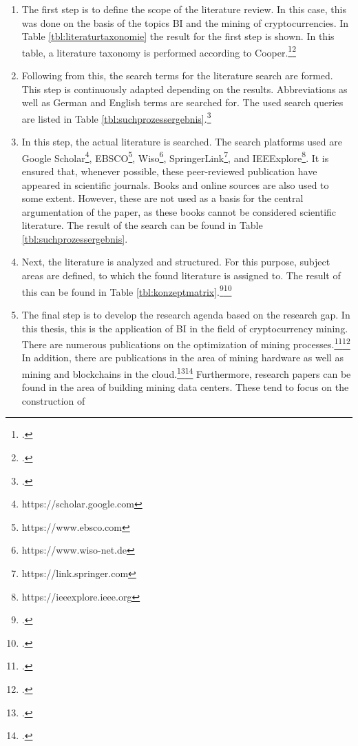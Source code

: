 \begin{enumerate} 
    \item The first step is to define the scope of the literature review. In this case, this was done on the basis of the topics \ac{BI} and
    the mining of cryptocurrencies. In Table \ref{tbl:literaturtaxonomie} the result for the first step is shown. In
    this table, a literature taxonomy is performed according to Cooper.\footcite[Cf.][p. 2212]{brocke2009reconstructing}\footcite[Cf.][]{cooper1988organizing} 
    \item Following from this, the search terms for the literature search are formed. This step is continuously adapted depending on
    the results. Abbreviations as well as German and English terms are searched for. The used 
    search queries are listed in Table \ref{tbl:suchprozessergebnis}.\footcite[Cf.][pp. 2211]{brocke2009reconstructing} 
    \item In this step, the actual literature is searched. The search platforms used are Google
    Scholar\footnote{https://scholar.google.com}, EBSCO\footnote{https://www.ebsco.com}, Wiso\footnote{https://www.wiso-net.de}, 
    SpringerLink\footnote{https://link.springer.com}, and IEEExplore\footnote{https://ieeexplore.ieee.org}. It is ensured that,
    whenever possible, these peer-reviewed publication have appeared in scientific journals. 
    Books and online sources are also used to some extent. However, these are not used as a basis for the central
    argumentation of the paper, as these books cannot be considered scientific literature. The result of the
    search can be found in Table \ref{tbl:suchprozessergebnis}. 
    \item Next, the literature is analyzed and structured. For this purpose, subject areas are defined, to which the found literature is assigned
    to. The result of this can be found in Table \ref{tbl:konzeptmatrix}.\footcite[Cf.][p. 2214]{brocke2009reconstructing}\footcite[Cf.][]{webster2002analyzing}  
    \item The final step is to develop the research agenda based on the research gap. In this thesis, this is the application of
    \ac{BI} in the field of cryptocurrency mining. There are numerous publications on the optimization of mining
    processes.\footcite[Cf.][]{han2019demystifying}\footcite[Cf.][]{courtois2014optimizing} In addition, there are publications in the
    area of mining hardware as well as mining and blockchains in the cloud.\footcite[Cf.][]{taylor2017evolution}\footcite[Cf.][]{gai2020blockchain} 
    Furthermore, research papers can be found in the area of building mining data centers. These tend to focus on the construction of

\end{enumerate}
